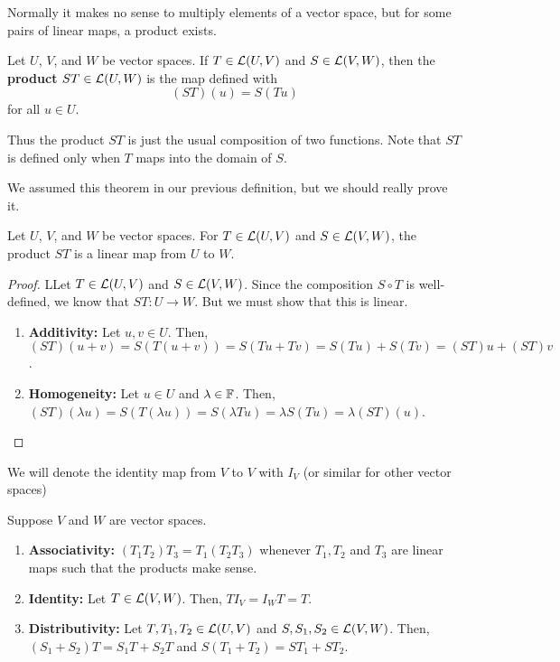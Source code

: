 Normally it makes no sense to multiply elements of a vector space, but for some pairs of linear maps, a product exists.
\begin{definition}
    Let $U$, $V$, and $W$ be vector spaces. If $T\in \mathcal{L}(U,V)$ and $S\in \mathcal{L} (V,W)$, then the \textbf{product} $ST\in \mathcal{L}(U, W)$ is the map defined with
    \[ (ST)(u) = S(Tu) \]
    for all $u\in U$.
\end{definition}
Thus the product $ST$ is just the usual composition of two functions. Note that $ST$ is defined only when $T$ maps into the domain of $S$.
\begin{theorem}
    We assumed this theorem in our previous definition, but we should really prove it. 
    
    Let $U$, $V$, and $W$ be vector spaces. For $T\in \mathcal{L}(U,V)$ and $S\in\mathcal{L}(V,W)$, the product $ST$ is a linear map from $U$ to $W$.
\end{theorem}
\begin{proof}
    LLet $T\in\mathcal{L}(U,V)$ and $S\in\mathcal{L}(V,W)$. Since the composition $S\circ T$ is well-defined, we know that $ST : U \to W$. But we must show that this is linear.

    \begin{enumerate}
        \item \textbf{Additivity:} Let $u, v\in U$. Then, $(ST)(u+v) = S(T(u+v)) = S(Tu+Tv) = S(Tu) + S(Tv) = (ST)u + (ST)v$.
        \item \textbf{Homogeneity:} Let $u\in U$ and $\lambda\in\mathbb F$. Then, $(ST)(\lambda u) = S(T(\lambda u)) = S(\lambda Tu) = \lambda S(Tu) = \lambda (ST)(u)$.
    \end{enumerate}
\end{proof}
We will denote the identity map from $V$ to $V$ with $I_V$ (or similar for other vector spaces)
\begin{theorem}
Suppose $V$ and $W$ are vector spaces.
    \begin{enumerate}
        \item \textbf{Associativity:} $(T_1T_2)T_3 = T_1(T_2T_3)$ whenever $T_1, T_2$ and $T_3$ are linear maps such that the products make sense. 
        \item \textbf{Identity:} Let $T\in \mathcal{L}(V,W)$. Then, $TI_V = I_WT = T$.
        \item \textbf{Distributivity:} Let $T,T_1, T_2\in \mathcal{L}(U,V)$ and $S,S_1,S_2\in\mathcal{L}(V,W)$. Then, $(S_1+S_2)T = S_1T + S_2T$ and $S(T_1+T_2) = ST_1 + ST_2$.
    \end{enumerate}
\end{theorem}
